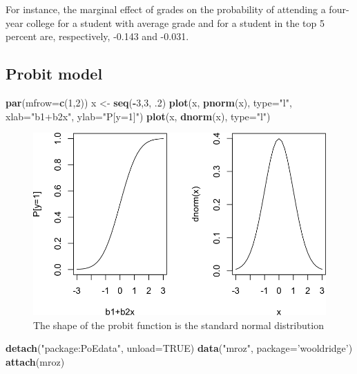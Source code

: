 \documentclass[]{book}
\newenvironment{Shaded}{\begin{snugshade}}{\end{snugshade}}
\newcommand{\DataTypeTok}[1]{\textcolor[rgb]{0.13,0.29,0.53}{#1}}
\newcommand{\DecValTok}[1]{\textcolor[rgb]{0.00,0.00,0.81}{#1}}
\newcommand{\FloatTok}[1]{\textcolor[rgb]{0.00,0.00,0.81}{#1}}
\newcommand{\KeywordTok}[1]{\textcolor[rgb]{0.13,0.29,0.53}{\textbf{#1}}}
\newcommand{\NormalTok}[1]{#1}
\newcommand{\OperatorTok}[1]{\textcolor[rgb]{0.81,0.36,0.00}{\textbf{#1}}}
\newcommand{\OtherTok}[1]{\textcolor[rgb]{0.56,0.35,0.01}{#1}}
\newcommand{\StringTok}[1]{\textcolor[rgb]{0.31,0.60,0.02}{#1}}
\begin{document}
For instance, the marginal effect of grades on the probability of attending a four-year college for a student with average grade and for a student in the top 5 percent are, respectively, -0.143 and -0.031.

\hypertarget{probit-model}{%
\subsection{Probit model}\label{probit-model}}

\begin{Shaded}
\begin{Highlighting}[]
\KeywordTok{par}\NormalTok{(}\DataTypeTok{mfrow=}\KeywordTok{c}\NormalTok{(}\DecValTok{1}\NormalTok{,}\DecValTok{2}\NormalTok{))  }
\NormalTok{x <-}\StringTok{ }\KeywordTok{seq}\NormalTok{(}\OperatorTok{-}\DecValTok{3}\NormalTok{,}\DecValTok{3}\NormalTok{, }\FloatTok{.2}\NormalTok{)}
\KeywordTok{plot}\NormalTok{(x, }\KeywordTok{pnorm}\NormalTok{(x), }\DataTypeTok{type=}\StringTok{"l"}\NormalTok{, }\DataTypeTok{xlab=}\StringTok{"b1+b2x"}\NormalTok{, }\DataTypeTok{ylab=}\StringTok{"P[y=1]"}\NormalTok{)}
\KeywordTok{plot}\NormalTok{(x, }\KeywordTok{dnorm}\NormalTok{(x), }\DataTypeTok{type=}\StringTok{"l"}\NormalTok{)}
\end{Highlighting}
\end{Shaded}

\begin{figure}

{\centering \includegraphics[width=0.8\linewidth]{MEM5220_R_files/figure-latex/fig21-1} 

}

\caption{The shape of the probit function is the standard normal distribution}\label{fig:fig21}
\end{figure}

\begin{Shaded}
\begin{Highlighting}[]
\KeywordTok{detach}\NormalTok{(}\StringTok{"package:PoEdata"}\NormalTok{, }\DataTypeTok{unload=}\OtherTok{TRUE}\NormalTok{)}
\KeywordTok{data}\NormalTok{(}\StringTok{"mroz"}\NormalTok{, }\DataTypeTok{package=}\StringTok{'wooldridge'}\NormalTok{)}
\KeywordTok{attach}\NormalTok{(mroz)}
\end{Highlighting}
\end{Shaded}
\end{document}
